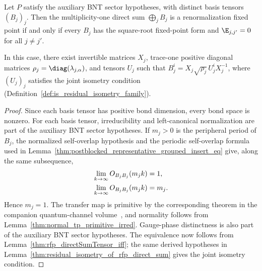 \begin{corollary}%
    \label{cor:rfp_bnt_basis_direct_sum_iff}
    \leanok
    Let $P$ satisfy the auxiliary BNT sector hypotheses, with distinct basis tensors $(B_j)_j$.
    Then the multiplicity-one direct sum $\bigoplus_j B_j$ is a
    renormalization fixed point if and only if every $B_j$ has the square-root
    fixed-point form and $\E_{j,j'}=0$ for all $j\ne j'$.

    In this case, there exist invertible matrices $X_j$, trace-one positive
    diagonal matrices $\rho_j=\diag(\lambda_{j,\alpha})$, and tensors $U_j$
    such that $B_j^i=X_j\sqrt{\rho_j}\,U_j^iX_j^{-1}$, where $(U_j)_j$
    satisfies the joint isometry condition
    (Definition~\ref{def:is_residual_isometry_family}).
\end{corollary}
\begin{proof}\leanok
    Since each basis tensor has positive bond dimension, every bond space is
    nonzero. For each basis
    tensor, irreducibility and left-canonical normalization are part of the
    auxiliary BNT sector hypotheses. If $m_j>0$ is the peripheral period of
    $B_j$, the
    normalized self-overlap hypothesis and the periodic self-overlap formula
    used in Lemma~\ref{thm:postblocked_representative_grouped_insert_eq} give,
    along the same subsequence,
    \begin{align}
        \lim_{k\to\infty}O_{B_jB_j}(m_jk) & =1,
        \notag                                    \\
        \lim_{k\to\infty}O_{B_jB_j}(m_jk) & =m_j.
        \notag
    \end{align}
    Hence $m_j=1$. The transfer map is primitive by
    the corresponding theorem in the companion quantum-channel volume~\cite[``Primitivity equals period one'']{QICLean2026Blueprint}, and normality follows from
    Lemma~\ref{thm:normal_tp_primitive_irred}. Gauge-phase distinctness is
    also part of the auxiliary BNT sector hypotheses. The equivalence now
    follows from
    Lemma~\ref{thm:rfp_directSumTensor_iff}; the same derived hypotheses in
    Lemma~\ref{thm:residual_isometry_of_rfp_direct_sum} gives the joint
    isometry condition.
\end{proof}


